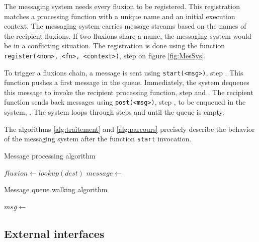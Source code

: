 The messaging system needs every fluxion to be registered.
This registration matches a processing function with a unique name and an initial execution context.
The messaging system carries message streams based on the names of the recipient fluxions.
If two fluxions share a name, the messaging system would be in a conflicting situation.
The registration is done using the function \texttt{register(<nom>, <fn>, <context>)}, step  on figure \ref{fig:MesSys}.

To trigger a fluxions chain, a message is sent using \texttt{start(<msg>)}, step .
This function pushes a first message in the queue.
Immediately, the system dequeues this message to invoke the recipient processing function, step  and .
The recipient function sends back messages using \texttt{post(<msg>)}, step , to be enqueued in the system, .
The system loops through steps  and  until the queue is empty.

The algorithms \ref{alg:traitement} and \ref{alg:parcours} precisely describe the behavior of the messaging system after the function \texttt{start} invocation.

\begin{algorithm}
\caption{Message processing algorithm}
\label{alg:traitement}
\begin{algorithmic}
\State $fluxion \gets lookup(dest)$
\State $message \gets$  
\State {} 
\EndFor
\EndFunction
\end{algorithmic}
\end{algorithm}

\begin{algorithm}
\caption{Message queue walking algorithm}
\label{alg:parcours}
\begin{algorithmic}
\State $msg \gets$  
\State {}
\EndWhile
\EndFunction
\end{algorithmic}
\end{algorithm}

\subsection{External interfaces}


